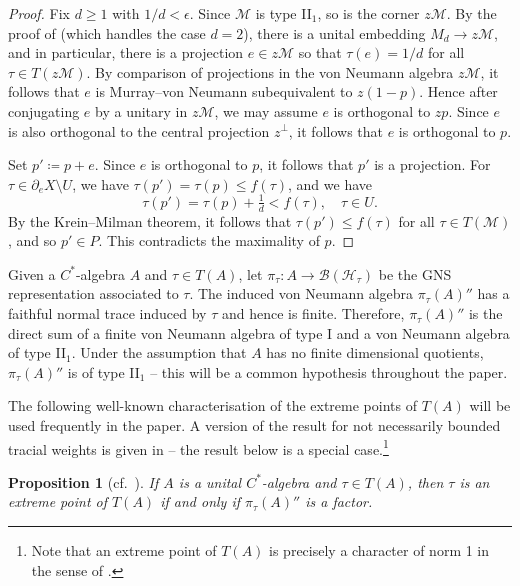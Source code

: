 \documentclass[a4paper,11pt]{amsart}
\newtheorem{proposition}[theorem]{Proposition}
\theoremstyle{definition}
\numberwithin{equation}{section}
\numberwithin{theorem}{section}
\newcommand{\M}{\mathcal{M}}
\begin{document}
\begin{proof}
	
	Fix $d \geq 1$ with $1/d < \epsilon$. Since $\M$ is type II$_1$, so is the corner $z \M$. By the proof of \cite[Theorem~V.1.35]{Tak79} (which handles the case $d = 2$), there is a unital embedding $M_d \rightarrow z \M$, and in particular, there is a projection $e \in z\M$ so that $\tau(e) = 1/d$ for all $\tau \in T(z\M)$. By comparison of projections in the von Neumann algebra $z\M$, it follows that $e$ is Murray--von Neumann subequivalent to $z(1-p)$. 
	Hence after conjugating $e$ by a unitary in $z\M$, we may assume $e$ is orthogonal to $zp$. Since $e$ is also orthogonal to the central projection $z^\perp$, it follows that $e$ is orthogonal to $p$.
	
	Set $p' \coloneqq p + e$. Since $e$ is orthogonal to $p$, it follows that $p'$ is a projection.  For $\tau \in \partial_e X \setminus U$, we have $\tau(p') = \tau(p) \leq f(\tau)$, and we have 
    \begin{equation}
        \tau(p') = \tau(p) + \tfrac{1}{d} < f(\tau), \quad \tau \in U.
    \end{equation}  By the Krein--Milman theorem, it follows that $\tau(p') \leq f(\tau)$ for all $\tau \in T(\M)$, and so $p' \in P$.  This contradicts the maximality of $p$. 
\end{proof}

Given a $C^*$-algebra $A$ and $\tau \in T(A)$, let $\pi_\tau\colon A \to \mathcal B(\mathcal H_\tau)$ be the GNS representation associated to $\tau$. The induced von Neumann algebra $\pi_\tau(A)''$ has a faithful normal trace induced by $\tau$ and hence is finite. Therefore, $\pi_\tau(A)''$ is the direct sum of a finite von Neumann algebra of type I  and a von Neumann algebra of type II$_1$. Under the assumption that $A$ has no finite dimensional quotients, $\pi_\tau(A)''$ is of type II$_1$ -- this will be a common hypothesis throughout the paper.

The following well-known characterisation of the extreme points of $T(A)$ will be used frequently in the paper.  A version of the result for not necessarily bounded tracial weights is given in \cite[Theorem~6.7.3]{Di77} -- the result below is a special case.\footnote{Note that an extreme point of $T(A)$ is precisely a character of norm 1 in the sense of \cite[Definition~6.7.1]{Di77}.}

\begin{proposition}[{cf.\ \cite[Theorem 6.7.3]{Di77}}] \label{prop:factorial-extreme-point}
	If $A$ is a unital $C^*$-algebra and $\tau \in T(A)$, then $\tau$ is an extreme point of $T(A)$ if and only if $\pi_\tau(A)''$ is a factor.
\end{proposition}
\end{document}
